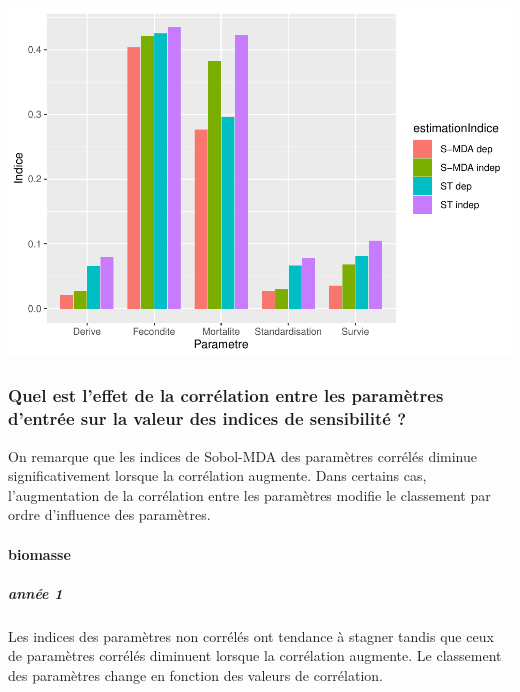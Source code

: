 \documentclass[
]{article}
\begin{document}
\includegraphics{rapport_files/figure-latex/zprtygs-1.pdf}

\hypertarget{quel-est-leffet-de-la-corruxe9lation-entre-les-paramuxe8tres-dentruxe9e-sur-la-valeur-des-indices-de-sensibilituxe9}{%
\subsubsection{Quel est l'effet de la corrélation entre les paramètres
d'entrée sur la valeur des indices de sensibilité
?}\label{quel-est-leffet-de-la-corruxe9lation-entre-les-paramuxe8tres-dentruxe9e-sur-la-valeur-des-indices-de-sensibilituxe9}}

On remarque que les indices de Sobol-MDA des paramètres corrélés diminue
significativement lorsque la corrélation augmente. Dans certains cas,
l'augmentation de la corrélation entre les paramètres modifie le
classement par ordre d'influence des paramètres.

\hypertarget{biomasse-9}{%
\paragraph{biomasse}\label{biomasse-9}}

\hypertarget{annuxe9e-1}{%
\subparagraph{année 1}\label{annuxe9e-1}}

Les indices des paramètres non corrélés ont tendance à stagner tandis
que ceux de paramètres corrélés diminuent lorsque la corrélation
augmente. Le classement des paramètres change en fonction des valeurs de
corrélation.
\end{document}
